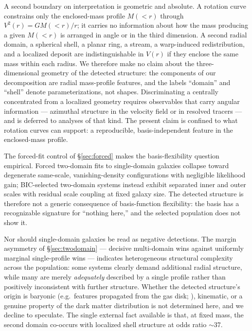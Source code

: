 \documentclass[twocolumn]{aastex701}
\begin{document}
A second boundary on interpretation is geometric and absolute. A rotation curve
constrains only the enclosed-mass profile $M({<}r)$ through $V^2(r) = G
M({<}r)/r$; it carries no information about how the mass producing a given
$M({<}r)$ is arranged in angle or in the third dimension. A second radial domain,
a spherical shell, a planar ring, a stream, a warp-induced redistribution, and a
localized deposit are indistinguishable in $V(r)$ if they enclose the same mass
within each radius. We therefore make no claim about the three-dimensional
geometry of the detected structure: the components of our decomposition are
radial mass-profile features, and the labels ``domain'' and ``shell'' denote
parameterizations, not shapes. Discriminating a centrally concentrated from a
localized geometry requires observables that carry angular information ---
azimuthal structure in the velocity field or in resolved tracers --- and is
deferred to analyses of that kind. The present claim is confined to what
rotation curves can support: a reproducible, basis-independent feature in the
enclosed-mass profile.

The forced-fit control of \S\ref{sec:forced} makes the basis-flexibility
question empirical. Forced two-domain fits to single-domain galaxies collapse
toward degenerate same-scale, vanishing-density configurations with
negligible likelihood gain; BIC-selected two-domain systems instead exhibit
separated inner and outer scales with residual scale coupling at fixed galaxy
size. The detected structure is therefore not a generic consequence of
basis-function flexibility: the basis has a recognizable signature for
``nothing here,'' and the selected population does not show it.

Nor should single-domain galaxies be read as negative detections. The margin
asymmetry of \S\ref{sec:twodomain} --- decisive multi-domain wins against
uniformly marginal single-profile wins --- indicates heterogeneous structural
complexity across the population: some systems clearly demand additional
radial structure, while many are merely \emph{adequately} described by a
single profile rather than positively inconsistent with further structure.
Whether the detected structure's origin is baryonic (e.g.\ features
propagated from the gas disk; \citealt{Sancisi2004}), kinematic, or a genuine
property of the dark matter distribution is not determined here, and we
decline to speculate. The single external fact available is that, at fixed
mass, the second domain co-occurs with localized shell structure at odds
ratio $\sim$37.
\end{document}
